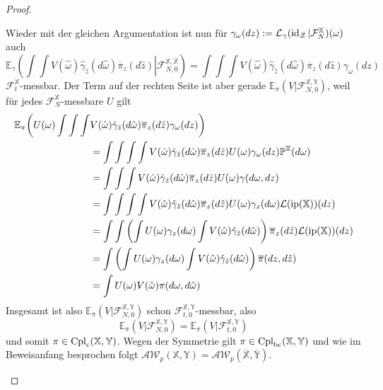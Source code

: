 \begin{proof}
\begin{enumerate}
Wieder mit der gleichen Argumentation ist nun für $\gamma_\omega(dz):=\mathcal{L}_\gamma(\operatorname{id}_{\mathcal{Z}} \vert \mathcal{F}_N^{\mathbb{X}})(\omega)$ auch
$$\mathbb{E}_{\gamma}\left( \int \int V(\hat{\omega}) \hat{\gamma}_{\hat{z}}(d\hat{\omega}) \overline{\pi}_z(d\hat{z}) \left\vert \mathcal{F}_{N,0}^{\mathbb{X}, \overline{\mathbb{X}}} \right. \right) = \int\int\int V(\hat{\omega}) \hat{\gamma}_{\hat{z}}(d\hat{\omega}) \overline{\pi}_z(d\hat{z})\gamma_\omega(dz)$$
$\mathcal{F}_t^{\mathbb{X}}$-messbar. Der Term auf der rechten Seite ist aber gerade $\mathbb{E}_\pi(V \vert \mathcal{F}_{N,0}^{\mathbb{X}, \mathbb{Y}})$, weil für jedes $\mathcal{F}_{N}^{\mathbb{X}}$-messbare $U$ gilt
\begin{align*}
    \mathbb{E}_{\pi}\biggl(U(\omega) \int\int\int &V(\hat{\omega}) \hat{\gamma}_{\hat{z}}(d\hat{\omega}) \overline{\pi}_z(d\hat{z})\gamma_\omega(dz) \biggr) \\
    &= \int\int\int\int V(\hat{\omega}) \hat{\gamma}_{\hat{z}}(d\hat{\omega}) \overline{\pi}_z(d\hat{z})U(\omega)\gamma_\omega(dz) \mathbb{P}^{\mathbb{X}}(d\omega) \\
    &= \int\int\int V(\hat{\omega}) \hat{\gamma}_{\hat{z}}(d\hat{\omega}) \overline{\pi}_z(d\hat{z})U(\omega)\gamma(d\omega, dz) \\
    &= \int\int\int\int V(\hat{\omega}) \hat{\gamma}_{\hat{z}}(d\hat{\omega}) \overline{\pi}_z(d\hat{z})U(\omega)\gamma_z(d\omega)\mathcal{L}(\operatorname{ip}(\mathbb{X}))(dz)\\
    &= \int\int\left(\int U(\omega)\gamma_z(d\omega) \int V(\hat{\omega}) \hat{\gamma}_{\hat{z}}(d\hat{\omega}) \right)\overline{\pi}_z(d\hat{z})\mathcal{L}(\operatorname{ip}(\mathbb{X}))(dz) \\
    &= \int\left(\int U(\omega)\gamma_z(d\omega) \int V(\hat{\omega}) \hat{\gamma}_{\hat{z}}(d\hat{\omega}) \right)\overline{\pi}(dz, d\hat{z}) \\
    &= \int U(\omega)V(\hat{\omega})\pi(d\omega, d\hat{\omega})
\end{align*}
Insgesamt ist also $\mathbb{E}_\pi(V\vert \mathcal{F}_{N,0}^{\mathbb{X}, \mathbb{Y}})$ schon $\mathcal{F}_{t,0}^{\mathbb{X}, \mathbb{Y}}$-messbar, also
$$\mathbb{E}_\pi(V \vert \mathcal{F}_{N,0}^{\mathbb{X}, \mathbb{Y}}) = \mathbb{E}_\pi(V \vert \mathcal{F}_{t,0}^{\mathbb{X}, \mathbb{Y}})$$
und somit $\pi\in \operatorname{Cpl}_{\operatorname{c}}(\mathbb{X}, \mathbb{Y})$. Wegen der Symmetrie gilt $\pi \in \operatorname{Cpl}_{\operatorname{bc}}(\mathbb{X}, \mathbb{Y})$ und wie im Beweisanfang besprochen folgt $\mathcal{AW}_p(\mathbb{X}, \mathbb{Y}) = \mathcal{AW}_p(\overline{\mathbb{X}}, \overline{\mathbb{Y}})$.

\end{enumerate}
\end{proof}
